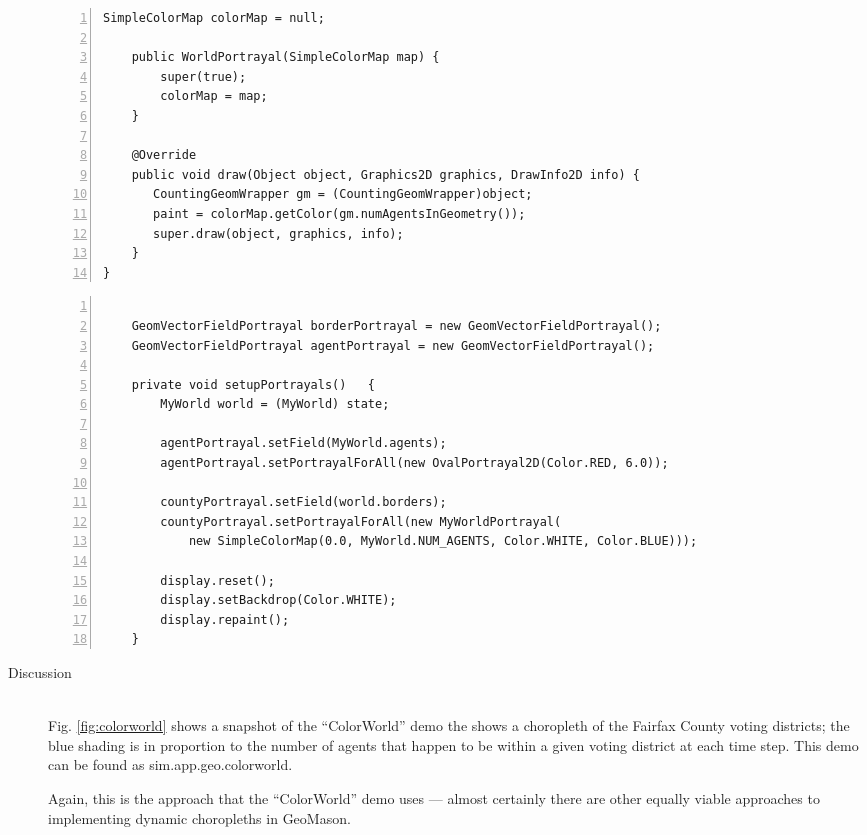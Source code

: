 \documentclass[twoside,10pt]{book}
\newcommand\file[1]{\textsf{#1}}
\newcommand\class[1]{\index{Classes!{#1}}\textsf{#1}}
\begin{document}
\begin{description}
\begin{Verbatim}[frame=lines,label=Portrayal that renders choropleth,framesep=5mm,numbers=left,commandchars=+\[\]]
    SimpleColorMap colorMap = null; 
	
    public WorldPortrayal(SimpleColorMap map) {
        super(true); 
        colorMap = map; 
    }
	
    @Override
    public void draw(Object object, Graphics2D graphics, DrawInfo2D info) {
       CountingGeomWrapper gm = (CountingGeomWrapper)object;
       paint = colorMap.getColor(gm.numAgentsInGeometry());
       super.draw(object, graphics, info);    
    }
}
\end{Verbatim}


\begin{Verbatim}[frame=lines,label=Set up portrayal in \class{GUIState},framesep=5mm,numbers=left,commandchars=+\[\]]

    GeomVectorFieldPortrayal borderPortrayal = new GeomVectorFieldPortrayal();
    GeomVectorFieldPortrayal agentPortrayal = new GeomVectorFieldPortrayal();

    private void setupPortrayals()   {
        MyWorld world = (MyWorld) state;

        agentPortrayal.setField(MyWorld.agents);
        agentPortrayal.setPortrayalForAll(new OvalPortrayal2D(Color.RED, 6.0));

        countyPortrayal.setField(world.borders);
        countyPortrayal.setPortrayalForAll(new MyWorldPortrayal(
            new SimpleColorMap(0.0, MyWorld.NUM_AGENTS, Color.WHITE, Color.BLUE)));

        display.reset();
        display.setBackdrop(Color.WHITE);
        display.repaint();
    }
\end{Verbatim}


\item[Discussion]~\\
Fig. \ref{fig:colorworld} shows a snapshot of the ``ColorWorld'' demo
the shows a choropleth of the Fairfax County voting districts; the
blue shading is in proportion to the number of agents that happen to
be within a given voting district at each time step.  This demo can be
found as \file{sim.app.geo.colorworld}.

Again, this is the approach that the ``ColorWorld'' demo uses ---
almost certainly there are other equally viable approaches to
implementing dynamic choropleths in GeoMason.


\end{description}
\end{document}
